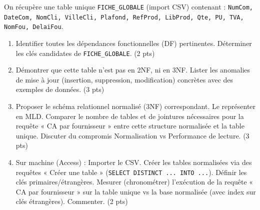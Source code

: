 \documentclass[11pt]{article}
\begin{document}
\begin{exercice}
On récupère une table unique \texttt{FICHE\_GLOBALE} (import CSV) contenant : \texttt{NumCom, DateCom, NomCli, VilleCli, Plafond, RefProd, LibProd, Qte, PU, TVA, NomFou, DelaiFou}.
\begin{enumerate}
    \item Identifier toutes les dépendances fonctionnelles (DF) pertinentes. Déterminer les clés candidates de \texttt{FICHE\_GLOBALE}. (2 pts)
    \item Démontrer que cette table n'est pas en 2NF, ni en 3NF. Lister les anomalies de mise à jour (insertion, suppression, modification) concrètes avec des exemples de données. (3 pts)
    \item Proposer le schéma relationnel normalisé (3NF) correspondant. Le représenter en MLD. Comparer le nombre de tables et de jointures nécessaires pour la requête « CA par fournisseur » entre cette structure normalisée et la table unique. Discuter du compromis Normalisation vs Performance de lecture. (3 pts)
    \item Sur machine (Access) : Importer le CSV. Créer les tables normalisées via des requêtes « Créer une table » (\texttt{SELECT DISTINCT ... INTO ...}). Définir les clés primaires/étrangères. Mesurer (chronométrer) l'exécution de la requête « CA par fournisseur » sur la table unique vs la base normalisée (avec index sur clés étrangères). Commenter. (2 pts)
\end{enumerate}
\end{exercice}
\end{document}

